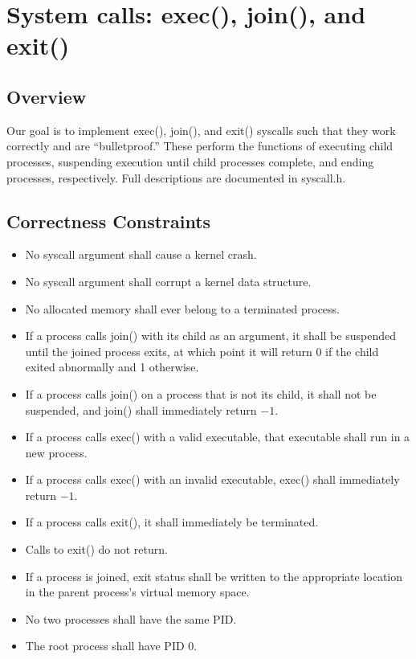 \section{System calls: {\ttfamily exec()}, {\ttfamily join()}, and {\ttfamily exit()}}
\subsection{Overview}
Our goal is to implement {\ttfamily exec()}, {\ttfamily join()}, and {\ttfamily exit()} syscalls such that they work correctly and are ``bulletproof.'' These perform the functions of executing child processes, suspending execution until child processes complete, and ending processes, respectively. Full descriptions are documented in {\ttfamily syscall.h}.
\subsection{Correctness Constraints}
\begin{itemize}
\item No syscall argument shall cause a kernel crash.
\item No syscall argument shall corrupt a kernel data structure.
\item No allocated memory shall ever belong to a terminated process.
\item If a process calls {\ttfamily join()} with its child as an argument, it shall be suspended until the joined process exits, at which point it will return 0 if the child exited abnormally and 1 otherwise.
\item If a process calls {\ttfamily join()} on a process that is not its child, it shall not be suspended, and {\ttfamily join()} shall immediately return $-1$.
\item If a process calls {\ttfamily exec()} with a valid executable, that executable shall run in a new process.
\item If a process calls {\ttfamily exec()} with an invalid executable, {\ttfamily exec()} shall immediately return $-1$.
\item If a process calls {\ttfamily exit()}, it shall immediately be terminated.
\item Calls to {\ttfamily exit()} do not return.
\item If a process is joined, exit status shall be written to the appropriate location in the parent process's virtual memory space.
\item No two processes shall have the same PID.
\item The root process shall have PID 0.

\end{itemize}
